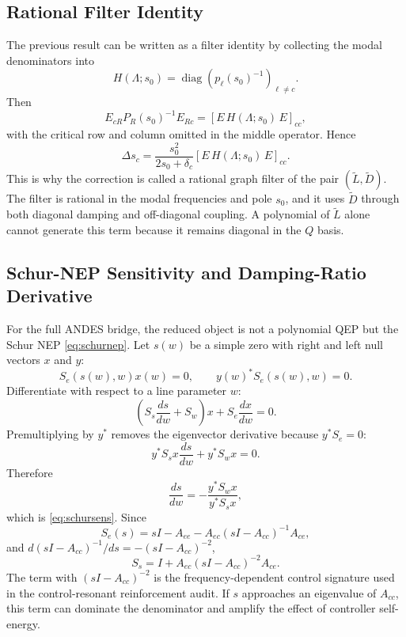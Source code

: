 \documentclass[journal]{IEEEtran}
\newcommand{\Lt}{\widetilde L}
\newcommand{\Dt}{\widetilde D}
\newcommand{\diag}{\operatorname{diag}}
\begin{document}
\subsection{Rational Filter Identity}

The previous result can be written as a filter identity by collecting the modal denominators into
\begin{equation}
H(\Lambda;s_0)=
\diag\left(p_\ell(s_0)^{-1}\right)_{\ell\neq c}.
\end{equation}
Then
\begin{equation}
E_{cR}P_R(s_0)^{-1}E_{Rc}
=\left[E\,H(\Lambda;s_0)\,E\right]_{cc},
\end{equation}
with the critical row and column omitted in the middle operator. Hence
\begin{equation}
\Delta s_c=
\frac{s_0^2}{2s_0+\delta_c}
\left[E\,H(\Lambda;s_0)\,E\right]_{cc}.
\end{equation}
This is why the correction is called a rational graph filter of the pair $(\Lt,\Dt)$. The filter is rational in the modal frequencies and pole $s_0$, and it uses $\Dt$ through both diagonal damping and off-diagonal coupling. A polynomial of $\Lt$ alone cannot generate this term because it remains diagonal in the $Q$ basis.

\subsection{Schur-NEP Sensitivity and Damping-Ratio Derivative}

For the full ANDES bridge, the reduced object is not a polynomial QEP but the Schur NEP \eqref{eq:schurnep}. Let $s(w)$ be a simple zero with right and left null vectors $x$ and $y$:
\begin{equation}
S_e(s(w),w)x(w)=0,\qquad
y(w)^\ast S_e(s(w),w)=0.
\end{equation}
Differentiate with respect to a line parameter $w$:
\begin{equation}
\left(S_s\frac{ds}{dw}+S_w\right)x
 +S_e\frac{dx}{dw}=0.
\end{equation}
Premultiplying by $y^\ast$ removes the eigenvector derivative because $y^\ast S_e=0$:
\begin{equation}
y^\ast S_sx\frac{ds}{dw}+y^\ast S_wx=0.
\end{equation}
Therefore
\begin{equation}
\frac{ds}{dw}=-\frac{y^\ast S_wx}{y^\ast S_sx},
\end{equation}
which is \eqref{eq:schursens}. Since
\begin{equation}
S_e(s)=sI-A_{ee}-A_{ec}(sI-A_{cc})^{-1}A_{ce},
\end{equation}
and $d(sI-A_{cc})^{-1}/ds=-(sI-A_{cc})^{-2}$,
\begin{equation}
S_s=I+A_{ec}(sI-A_{cc})^{-2}A_{ce}.
\end{equation}
The term with $(sI-A_{cc})^{-2}$ is the frequency-dependent control signature used in the control-resonant reinforcement audit. If $s$ approaches an eigenvalue of $A_{cc}$, this term can dominate the denominator and amplify the effect of controller self-energy.
\end{document}
